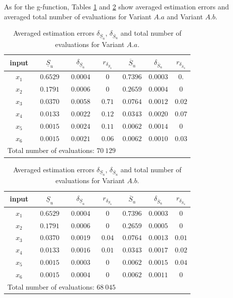 As for the g-function, Tables \ref{res.bratley.Aa} and \ref{res.bratley.Ab} show averaged estimation errors and averaged total number of evaluations for Variant $A.a$ and Variant $A.b$.
\begin{table}[!ht]
\caption{Averaged estimation errors $\delta_{\underline{S}_u}$, $\delta_{\overline{S}_u}$ and total number of evaluations for Variant $A.a$.}
\centering
\begin{tabular}{ccccccc}
\hline
 input & $\underline{S}_u$ & $\delta_{\underline{S}_u}$ & $r_{\delta_{\underline{S}_u}}$ & $\overline{S}_u$ & $\delta_{\overline{S}_u}$ &$r_{\delta_{\overline{S}_u}}$ \\ \hline
 $x_1$ & $0.6529$ &  $0.0004$ & $0$ & $0.7396$ & $0.0003$ & $0.$ \\ \hline
 $x_2$ & $0.1791$ &  $0.0006$ & $0$ & $0.2659$ & $0.0004$ & $0$ \\ \hline
 $x_3$ & $0.0370$ &  $0.0058$ & $0.71$ & $0.0764$ & $0.0012$ & $0.02$ \\ \hline
 $x_4$ & $0.0133$ &  $0.0022$ & $0.12$ & $0.0343$ & $0.0020$ & $0.07$ \\ \hline
 $x_5$ & $0.0015$ &  $0.0024$ & $0.11$ & $0.0062$ & $0.0014$ & $0$ \\ \hline
 $x_6$ & $0.0015$ & $0.0021$ & $0.06$  & $0.0062$ & $0.0010$ & $0.03$ \\ \hline \hline
\multicolumn{4}{l}{Total number of evaluations: $70 \ 129$} & & &\\ \hline 
\end{tabular}
\label{res.bratley.Aa}
\end{table}
\begin{table}[!ht]
\caption{Averaged estimation errors $\delta_{\underline{S}_u}$, $\delta_{\overline{S}_u}$ and total number of evaluations for Variant $A.b$.}
\centering
\begin{tabular}{ccccccc}
\hline
 input & $\underline{S}_u$ & $\delta_{\underline{S}_u}$ & $r_{\delta_{\underline{S}_u}}$ & $\overline{S}_u$ & $\delta_{\overline{S}_u}$ & $r_{\delta_{\overline{S}_u}}$ \\ \hline
 $x_1$ & $0.6529$ &  $0.0004$ & $0$ & $0.7396$ & $0.0003$ & $0$ \\ \hline
 $x_2$ & $0.1791$ &  $0.0006$ & $0$ & $0.2659$ & $0.0005$ & $0$ \\ \hline
 $x_3$ & $0.0370$ &  $0.0019$ & $0.04$ & $0.0764$ & $0.0013$ & $0.01$ \\ \hline
 $x_4$ & $0.0133$ &  $0.0016$ & $0.01$ & $0.0343$ & $0.0017$ & $0.02$ \\ \hline
 $x_5$ & $0.0015$ &  $0.0003$ & $0$ & $0.0062$ & $0.0015$ & $0.04$ \\ \hline
 $x_6$ & $0.0015$ &  $0.0004$ & $0$  & $0.0062$ & $0.0011$ & $0$ \\ \hline \hline
\multicolumn{4}{l}{Total number of evaluations: $68 \ 045$} & & &\\ \hline 
\end{tabular}
\label{res.bratley.Ab}
\end{table}
